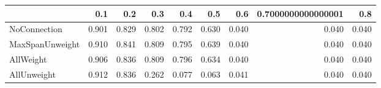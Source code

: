 \begin{tabular}{lrrrrrrrr}
\toprule
{} &   0.1 &   0.2 &   0.3 &   0.4 &   0.5 &   0.6 & 0.7000000000000001 &   0.8 \\
\midrule
NoConnection    & 0.901 & 0.829 & 0.802 & 0.792 & 0.630 & 0.040 &              0.040 & 0.040 \\
MaxSpanUnweight & 0.910 & 0.841 & 0.809 & 0.795 & 0.639 & 0.040 &              0.040 & 0.040 \\
AllWeight       & 0.906 & 0.836 & 0.809 & 0.796 & 0.634 & 0.040 &              0.040 & 0.040 \\
AllUnweight     & 0.912 & 0.836 & 0.262 & 0.077 & 0.063 & 0.041 &              0.040 & 0.040 \\
\bottomrule
\end{tabular}
